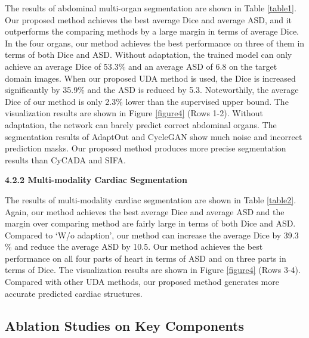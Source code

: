 \documentclass[letterpaper]{article} %
\begin{document}
\noindent The results of abdominal multi-organ segmentation are shown in Table \ref{table1}. Our proposed method achieves the best 
average Dice and average ASD, and it outperforms the comparing methods by a large margin in terms of average Dice. 
In the four organs, our method achieves the best performance on three of them in terms of both Dice 
and ASD. Without adaptation, the trained model can only achieve an average Dice of 53.3$\%$ and an average ASD 
of 6.8 on the target domain images. When our proposed UDA method is used, the Dice is increased significantly 
by 35.9$\%$ and the ASD is reduced by 5.3. Noteworthily, the average Dice of our method is only 2.3$\%$ 
lower than the supervised upper bound. The visualization results  are shown in Figure \ref{figure4} (Rows 1-2). 
Without adaptation, the network can barely predict correct abdominal organs. The segmentation 
results of AdaptOut and CycleGAN show much noise and incorrect prediction masks. Our proposed method produces more 
precise segmentation results than CyCADA and SIFA.

  
\noindent  \textbf{4.2.2 Multi-modality Cardiac Segmentation}

\noindent The results of multi-modality cardiac segmentation are shown in Table \ref{table2}. Again, our method achieves the 
best average Dice and average ASD and the margin over comparing method are fairly large in terms of both Dice 
and ASD. Compared to `W/o adaption', our method can increase the average Dice by 39.3$\%$ and reduce the average 
ASD by 10.5. Our method achieves the best performance on all four parts of heart in terms of ASD and on 
three parts in terms of Dice. The visualization results are shown in Figure \ref{figure4} (Rows 3-4). Compared 
with other UDA methods, our proposed method generates more accurate predicted cardiac structures. 



\subsection{Ablation Studies on Key Components}

\end{document}
